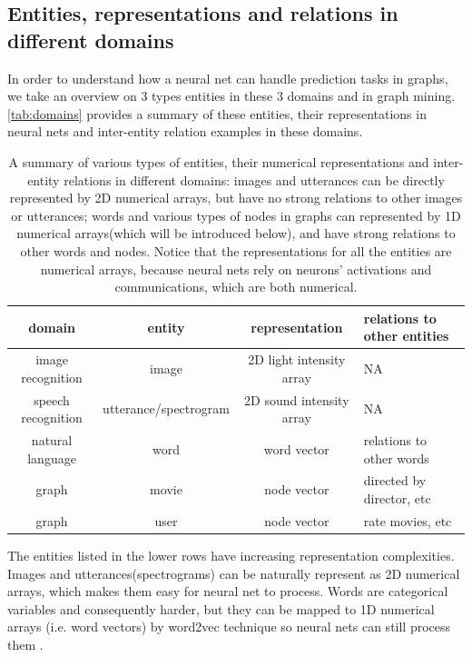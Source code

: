 \documentclass{article}
\begin{document}
\subsection{Entities, representations and relations in different domains}
In order to understand how a neural net can handle prediction tasks in graphs, 
we take an overview on 3 types entities in these 3 domains and in graph mining. 
\autoref{tab:domains} provides a summary of these entities, their 
representations in neural nets and inter-entity relation examples in these 
domains.
\begin{table}[h]
	\centering
	\begin{tabularx}{\textwidth}{ |c|c|c|X| }
		\hline domain & entity & representation & relations to other entities 
		\\ 
		\hline image recognition & image & 2D light intensity array & NA \\ 
		\hline speech recognition & utterance/spectrogram & 2D sound intensity 
		array & NA \\ 
		\hline natural language & word & word vector & relations to other words 
		\\ 
		\hline graph & movie & node vector & directed by director, etc \\ 
		\hline graph & user & node vector & rate movies, etc \\
		\hline
	\end{tabularx}
	\caption{A summary of various types of entities, their numerical 
	representations and inter-entity relations in different domains: images and 
	utterances can be directly represented by 2D numerical arrays, but have no 
	strong relations to other images or utterances; words and various types of 
	nodes in graphs can represented by 1D numerical arrays(which will be 
	introduced below), and have strong relations to other words and nodes. 
	Notice that the representations for all the entities are numerical arrays, 
	because neural nets rely on neurons' activations and communications, which 
	are both numerical.}
	\label{tab:domains}
\end{table}
The entities listed in the lower rows have increasing 
representation complexities.
Images and utterances(spectrograms) can be naturally represent as 2D numerical 
arrays, which makes them easy for neural net to process.
Words are categorical variables and consequently harder, but 
they can be mapped to 1D numerical arrays (i.e. word vectors) by word2vec 
technique so neural nets can still process them \cite{mikolov2013efficient}.
\end{document}
